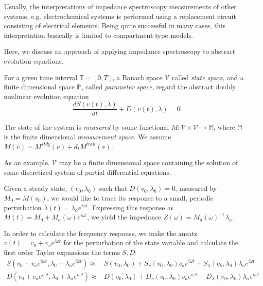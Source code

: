 \documentclass[12pt]{amsproc}
\newcommand{\CV}{{\mathcal{V}}}
\newcommand{\PP}{\mathbb{P}}
\newcommand{\TT}{\mathbb{T}}
\newcommand{\MM}{\mathbb{M}}
\newcommand{\Exp}[1]{e^{#1}}
\begin{document}
Usually, the interpretations of impedance spectroscopy measurements of
other  systems,  e.g. electrochemical  systems  is  performed using  a
replacement  circuit consisting of  electrical elements.   Being quite
successful in many cases,  this interpretation basically is limited to
compartment type models.

Here,  we discuss an  approach of  applying impedance  spectroscopy to
abstract evolution equations.

For a  given time  interval $\TT=[0,T]$, a  Banach space  $\CV$ called
{\em state space},  and a finite dimensional space  $\PP$, called {\em
parameter  space},  regard  the  abstract doubly  nonlinear  evolution
equation
\begin{equation}\label{eq:abstrevol}
 \frac{d S(v(t),\lambda)}{dt} + D(v(t),\lambda)=0
\end{equation}

The state of  the system is {\em measured} by  some functional $M: \CV \times \CV
\rightarrow  \MM$,   where  $\MM$  is  the   finite  dimensional  {\em
measurement space}. We assume  $M(v)=M^{stdy}(v)+ d_t M^{tran}(v)$.

As an example, $\CV$ may  be a finite dimensional space containing the
solution of some discretized system of partial differential equations.


Given   a  steady   state,  $(v_0,   \lambda_0)$  such   that  $D(v_0,
\lambda_0)=0$, measured  by $M_0=M(v_0)$, we  would like to  trace its
response  to  a small,  periodic  perturbation $\lambda(t)=  \lambda_a
\Exp{i\omega  t}   $.   Expressing   this  response  as   $M(t)=  M_0+
M_a(\omega)  \Exp{i\omega  t}$,  we  yield the  impedance  $Z(\omega)=
M_a(\omega)^{-1} \lambda_a$.



In order to calculate the frequency response, we make the ansatz $v(t)=v_0+v_a\Exp{i\omega  t}$ for
the perturbation of the state variable and calculate the first order Taylor expansions
the terms $S,D$:
\begin{equation*}
  \begin{split}
    S(v_0+v_a\Exp{i\omega  t},\lambda_0+\lambda_a\Exp{i\omega  t})\approx&S(v_0,\lambda_0)+ 
          S_v(v_0,\lambda_0)v_a\Exp{i\omega  t}+
          S_\lambda(v_0,\lambda_0)\lambda_a\Exp{i\omega  t}\\
    D(v_0+v_a\Exp{i\omega  t},\lambda_0+\lambda_a\Exp{i\omega  t})\approx&D(v_0,\lambda_0)+ 
          D_v(v_0,\lambda_0)v_a\Exp{i\omega  t}+
          D_\lambda(v_0,\lambda_0)\lambda_a\Exp{i\omega  t}
  \end{split}
\end{equation*}
\end{document}

